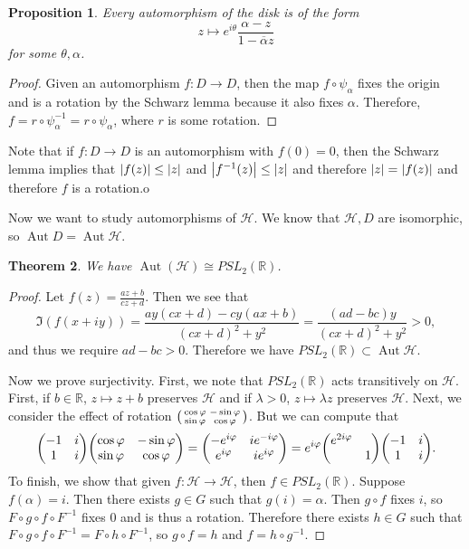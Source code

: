 \documentclass[leqno, openany]{memoir}
\newtheorem{thm}{Theorem}[section]
\newtheorem{prop}[thm]{Proposition}
\theoremstyle{definition}
\theoremstyle{remark}
\theoremstyle{plain}
\theoremstyle{definition}
\theoremstyle{remark}
\newcommand{\R}{\mathbb{R}}
\newcommand{\mc}[1]{\mathcal{#1}}
\newcommand{\ol}[1]{\overline{#1}}
\DeclareMathOperator{\Aut}{Aut}
\begin{document}
\begin{prop}
    Every automorphism of the disk is of the form
    \[ z \mapsto e^{i\theta} \frac{\alpha - z}{1 - \ol{\alpha} z} \]
    for some $\theta, \alpha$.
\end{prop}

\begin{proof}
    Given an automorphism $f \colon D \to D$, then the map $f \circ \psi_{\alpha}$ fixes the origin and is a rotation by the Schwarz lemma because it also fixes $\alpha$. Therefore, $f = r \circ \psi_{\alpha}^{-1} = r \circ \psi_{\alpha}$, where $r$ is some rotation.
\end{proof}

Note that if $f \colon D \to D$ is an automorphism with $f(0) = 0$, then the Schwarz lemma implies that $\abs{f(z)} \leq \abs{z}$ and $\abs{f^{-1}(z)} \leq \abs{z}$ and therefore $\abs{z} = \abs{f(z)}$ and therefore $f$ is a rotation.o

Now we want to study automorphisms of $\mc{H}$. We know that $\mc{H}, D$ are isomorphic, so $\Aut D = \Aut \mc{H}$.

\begin{thm}
    We have $\Aut(\mc{H}) \cong PSL_2(\R)$.
\end{thm}

\begin{proof}
    Let $f(z) = \frac{az + b}{cz + d}$. Then we see that
    \[ \Im(f(x+iy)) = \frac{ay(cx+d) - cy(ax+b)}{{(cx+d)}^2 + y^2} = \frac{(ad-bc)y}{{(cx+d)}^2 + y^2} > 0, \]
    and thus we require $ad - bc > 0$. Therefore we have $PSL_2(\R) \subset \Aut \mc{H}$.

    Now we prove surjectivity. First, we note that $PSL_2(\R)$ acts transitively on $\mc{H}$. First, if $b \in \R$, $z \mapsto z + b$ preserves $\mc{H}$ and if $\lambda > 0$, $z \mapsto \lambda z$ preserves $\mc{H}$. Next, we consider the effect of rotation $ \begin{psmallmatrix}
        \cos \varphi & - \sin \varphi \\ \sin \varphi & \cos \varphi
    \end{psmallmatrix}$. But we can compute that
    \[ \mqty(-1 & i \\ 1 & i) \mqty( \cos \varphi & - \sin \varphi \\ \sin \varphi & \cos \varphi ) = \mqty(-e^{i\varphi} & ie^{-i\varphi} \\ e^{i\varphi} & ie^{i\varphi}) = e^{i\varphi} \mqty(e^{2i\varphi} & \\ & 1) \mqty(-1 & i \\ 1 & i). \]
    To finish, we show that given $f \colon \mc{H} \to \mc{H}$, then $f \in PSL_2(\R)$. Suppose $f(\alpha) = i$. Then there exists $g \in G$ such that $g(i) = \alpha$. Then $g \circ f$ fixes $i$, so $F \circ g \circ f \circ F^{-1}$ fixes $0$ and is thus a rotation. Therefore there exists $h \in G$ such that $F \circ g \circ f \circ F^{-1} = F \circ h \circ F^{-1}$, so $g \circ f = h$ and $f = h \circ g^{-1}$.
\end{proof}
\end{document}
